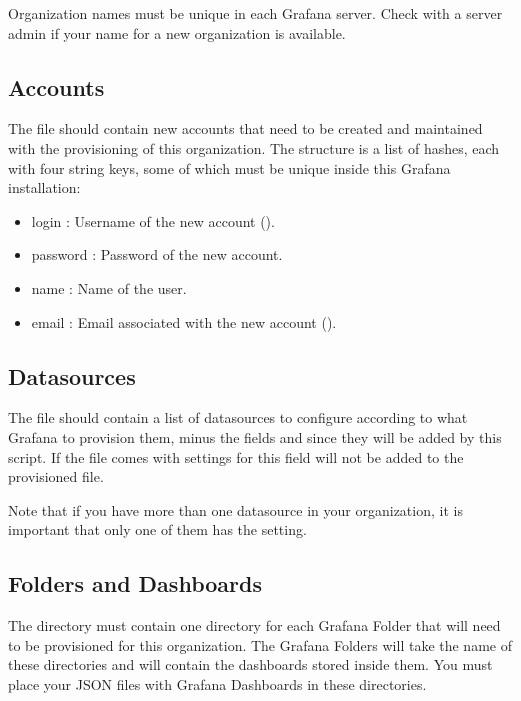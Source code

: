 \documentclass[letterpaper,10pt,english]{sphinxmanual}
\begin{document}
Organization names must be unique in each Grafana server. Check with a server
admin if your name for a new organization is available.


\subsection{Accounts}
\label{\detokenize{inputStructure:accounts}}
The  file should contain new accounts that need to be created
and maintained with the provisioning of this organization. The structure is a
list of hashes, each with four string keys, some of which must be unique inside
this Grafana installation:
\begin{itemize}
\item {} 
login : Username of the new account ().

\item {} 
password : Password of the new account.

\item {} 
name : Name of the user.

\item {} 
email : Email associated with the new account ().

\end{itemize}


\subsection{Datasources}
\label{\detokenize{inputStructure:datasources}}
The  file should contain a list of datasources to configure
according to what Grafana 
to provision them, minus the fields  and  since they will
be added by this script. If the file comes with settings for
 this field will not be added to the provisioned file.

Note that if you have more than one datasource in your organization, it is
important that only one of them has the  setting.


\subsection{Folders and Dashboards}
\label{\detokenize{inputStructure:folders-and-dashboards}}
The  directory must contain one directory for each Grafana
Folder that will need to be provisioned for this organization. The Grafana
Folders will take the name of these directories and will contain the dashboards
stored inside them. You must place your JSON files with Grafana Dashboards in
these directories.
\end{document}
